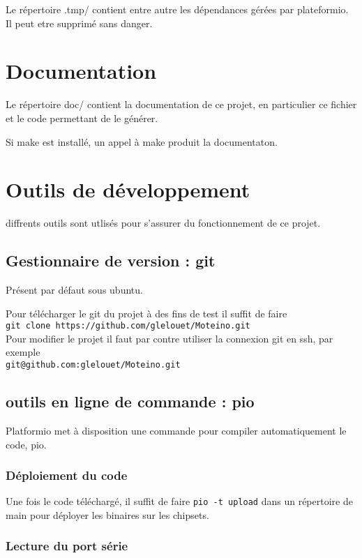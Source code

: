 \documentclass[a4paper]{report}
\begin{document}
Le répertoire .tmp/ contient entre autre les dépendances gérées par plateformio. Il peut etre supprimé sans danger.

\section{Documentation}

Le répertoire doc/ contient la documentation de ce projet, en particulier ce fichier et le code permettant de le générer.

Si make est installé, un appel à make produit la documentaton.

\section{Outils de développement}

diffrents outils sont utlisés pour s'assurer du fonctionnement de ce projet.

\subsection{Gestionnaire de version : git}

Présent par défaut sous ubuntu.

Pour télécharger le git du projet à des fins de test il suffit de faire\\
\verb+git clone https://github.com/glelouet/Moteino.git+\\

Pour modifier le projet il faut par contre utiliser la connexion git en ssh, par exemple\\
\verb+git@github.com:glelouet/Moteino.git+

\subsection{outils en ligne de commande : pio}

Platformio met à disposition une commande pour compiler automatiquement le code, pio.

\subsubsection{Déploiement du code}

Une fois le code téléchargé, il suffit de faire \verb+pio -t upload+ dans un répertoire de main pour déployer les binaires sur les chipsets.

\subsubsection{Lecture du port série}
\end{document}
